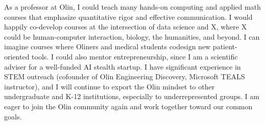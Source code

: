 \documentclass[11pt,letterpaper,roman]{moderncv}        %
\begin{document}
As a professor at Olin, I could teach many hands-on computing and applied math courses that emphasize quantitative rigor and effective communication. I would happily co-develop courses at the intersection of data science and X, where X could be human-computer interaction, biology, the humanities, and beyond. I can imagine courses where Oliners and medical students codesign new patient-oriented tools.
I could also mentor entrepreneurship, 
since I am a scientific adviser for a well-funded AI stealth startup. I have significant experience in STEM outreach (cofounder of Olin Engineering Discovery, Microsoft TEALS instructor), and I will continue to export the Olin mindset to other undergraduate and K-12 institutions, especially to underrepresented groups.
I am eager to join the Olin community again and work together toward our common goals.


\makeletterclosing
\end{document}
